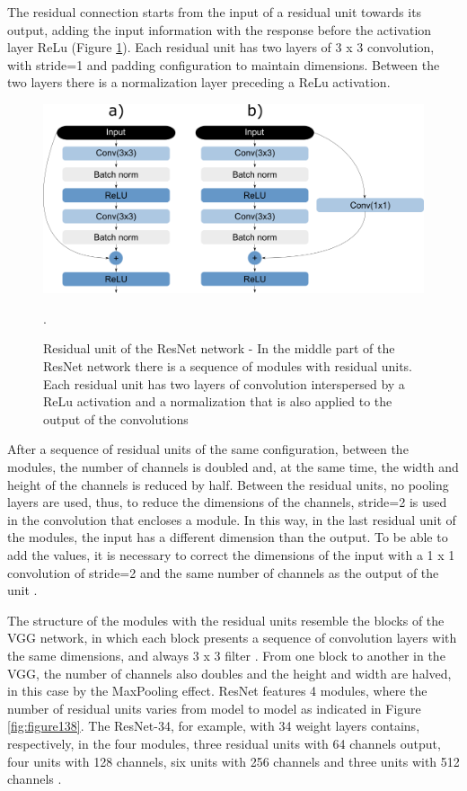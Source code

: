 The residual connection starts from the input of a residual unit towards its output, adding the input information with the response before the activation layer ReLu (Figure  \ref{fig:figure137}). Each residual unit has two layers of 3 x 3 convolution, with stride=1 and padding configuration to maintain dimensions. Between the two layers there is a normalization layer preceding a ReLu activation.

\begin{figure}
    \centering
    \includegraphics[scale=0.4]{images/figure137.png}
    \caption{Residual unit of the ResNet network - In the middle part of the ResNet network there is a sequence of modules with residual units. Each residual unit has two layers of convolution interspersed by a ReLu activation and a normalization that is also applied to the output of the convolutions \cite{geron2019}}.
    \label{fig:figure137}
\end{figure}

After a sequence of residual units of the same configuration, between the modules, the number of channels is doubled and, at the same time, the width and height of the channels is reduced by half. Between the residual units, no pooling layers are used, thus, to reduce the dimensions of the channels, stride=2 is used in the convolution that encloses a module. In this way, in the last residual unit of the modules, the input has a different dimension than the output. To be able to add the values, it is necessary to correct the dimensions of the input with a 1 x 1 convolution of stride=2 and the same number of channels as the output of the unit    \cite{zhang2020dive}.

The structure of the modules with the residual units resemble the blocks of the VGG network, in which each block presents a sequence of convolution layers with the same dimensions, and always 3 x 3 filter . From one block to another in the VGG, the number of channels also doubles and the height and width are halved, in this case by the MaxPooling effect. ResNet features 4 modules, where the number of residual units varies from model to model as indicated in Figure \ref{fig:figure138}. The ResNet-34, for example, with 34 weight layers contains, respectively, in the four modules, three residual units with 64 channels output, four units with 128 channels, six units with 256 channels and three units with 512 channels \cite{he2016}.

